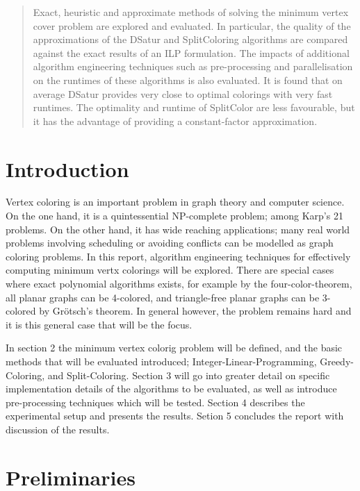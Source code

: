 \documentclass[twocolumn]{article}
\begin{document}


\begin{abstract}
	Exact, heuristic and approximate methods of solving the minimum vertex cover problem are explored and evaluated. In particular, the quality of the approximations of the DSatur and SplitColoring algorithms are compared against the exact results of an ILP formulation. The impacts of additional algorithm engineering techniques such as pre-processing and parallelisation on the runtimes of these algorithms is also evaluated. It is found that on average DSatur provides very close to optimal colorings with very fast runtimes. The optimality and runtime of SplitColor are less favourable, but it has the advantage of providing a constant-factor approximation.
\end{abstract}


\section{Introduction}
Vertex coloring is an important problem in graph theory and computer science. On the one hand, it is a quintessential NP-complete problem; among Karp's 21 problems. On the other hand, it has wide reaching applications; many real world problems involving scheduling or avoiding conflicts can be modelled as graph coloring problems. In this report, algorithm engineering techniques for effectively computing minimum vertx colorings will be explored. There are special cases where exact polynomial algorithms exists, for example by the four-color-theorem, all planar graphs can be 4-colored, and triangle-free planar graphs can be 3-colored by Grötsch's theorem. In general however, the problem remains hard and it is this general case that will be the focus.

In section 2 the minimum vertex colorig problem will be defined, and the basic methods that will be evaluated introduced; Integer-Linear-Programming, Greedy-Coloring, and Split-Coloring. Section 3 will go into greater detail on specific implementation details of the algorithms to be evaluated, as well as introduce pre-processing techniques which will be tested. Section 4 describes the experimental setup and presents the results. Setion 5 concludes the report with discussion of the results.

\section{Preliminaries}
\end{document}
